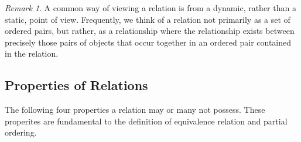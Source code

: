 \documentclass{book}
\theoremstyle{definition}
\theoremstyle{remark}
\newtheorem{remark}{Remark}
\begin{document}
    
    \begin{remark}
        A common way of viewing a relation is from a dynamic, rather than a static, point of view. Frequently, we think of a relation not primarily as a set of ordered pairs, but rather, as a relationship where the relationship exists between precisely those pairs of objects that occur together in an ordered pair contained in the relation.
    \end{remark}
    
    

\newpage
\subsection{Properties of Relations}

    The following four properties a relation may or many not possess. These properites are fundamental to the definition of equivalence relation and partial ordering. 
    
\end{document}
